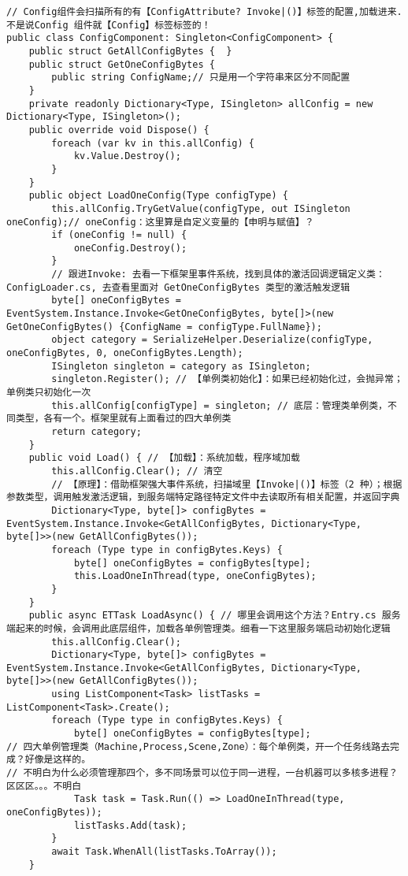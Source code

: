 \documentclass[9pt, b5paper]{article}
\begin{document}
\begin{verbatim}
// Config组件会扫描所有的有【ConfigAttribute? Invoke|()】标签的配置,加载进来. 不是说Config 组件就【Config】标签标签的！
public class ConfigComponent: Singleton<ConfigComponent> {
    public struct GetAllConfigBytes {  }
    public struct GetOneConfigBytes {
        public string ConfigName;// 只是用一个字符串来区分不同配置 
    }
    private readonly Dictionary<Type, ISingleton> allConfig = new Dictionary<Type, ISingleton>();
    public override void Dispose() {
        foreach (var kv in this.allConfig) {
            kv.Value.Destroy();
        }
    }
    public object LoadOneConfig(Type configType) {
        this.allConfig.TryGetValue(configType, out ISingleton oneConfig);// oneConfig：这里算是自定义变量的【申明与赋值】？
        if (oneConfig != null) {
            oneConfig.Destroy();
        } 
        // 跟进Invoke: 去看一下框架里事件系统，找到具体的激活回调逻辑定义类：ConfigLoader.cs, 去查看里面对 GetOneConfigBytes 类型的激活触发逻辑
        byte[] oneConfigBytes = EventSystem.Instance.Invoke<GetOneConfigBytes, byte[]>(new GetOneConfigBytes() {ConfigName = configType.FullName});
        object category = SerializeHelper.Deserialize(configType, oneConfigBytes, 0, oneConfigBytes.Length);
        ISingleton singleton = category as ISingleton;
        singleton.Register(); // 【单例类初始化】：如果已经初始化过，会抛异常；单例类只初始化一次
        this.allConfig[configType] = singleton; // 底层：管理类单例类，不同类型，各有一个。框架里就有上面看过的四大单例类
        return category;
    }
    public void Load() { // 【加载】：系统加载，程序域加载 
        this.allConfig.Clear(); // 清空
        // 【原理】：借助框架强大事件系统，扫描域里【Invoke|()】标签（2 种）；根据参数类型，调用触发激活逻辑，到服务端特定路径特定文件中去读取所有相关配置，并返回字典
        Dictionary<Type, byte[]> configBytes = EventSystem.Instance.Invoke<GetAllConfigBytes, Dictionary<Type, byte[]>>(new GetAllConfigBytes());
        foreach (Type type in configBytes.Keys) {
            byte[] oneConfigBytes = configBytes[type];
            this.LoadOneInThread(type, oneConfigBytes);
        }
    }
    public async ETTask LoadAsync() { // 哪里会调用这个方法？Entry.cs 服务端起来的时候，会调用此底层组件，加载各单例管理类。细看一下这里服务端启动初始化逻辑
        this.allConfig.Clear();
        Dictionary<Type, byte[]> configBytes = EventSystem.Instance.Invoke<GetAllConfigBytes, Dictionary<Type, byte[]>>(new GetAllConfigBytes());
        using ListComponent<Task> listTasks = ListComponent<Task>.Create();
        foreach (Type type in configBytes.Keys) {
            byte[] oneConfigBytes = configBytes[type];
// 四大单例管理类（Machine,Process,Scene,Zone）：每个单例类，开一个任务线路去完成？好像是这样的。
// 不明白为什么必须管理那四个，多不同场景可以位于同一进程，一台机器可以多核多进程？区区区。。。不明白
            Task task = Task.Run(() => LoadOneInThread(type, oneConfigBytes)); 
            listTasks.Add(task);
        }
        await Task.WhenAll(listTasks.ToArray());
    }


\end{verbatim}
\end{document}
